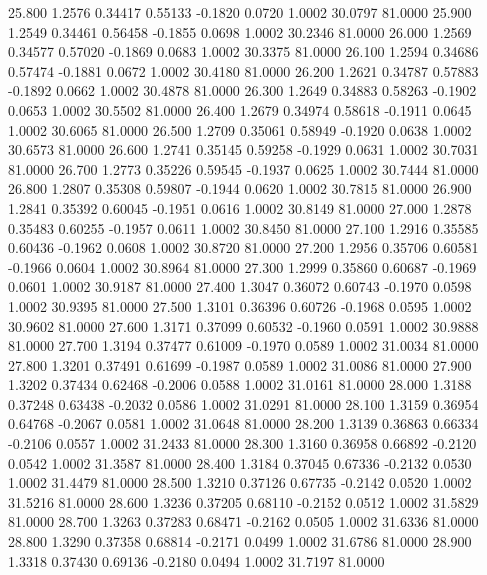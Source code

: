   25.800   1.2576   0.34417   0.55133  -0.1820   0.0720   1.0002  30.0797  81.0000
  25.900   1.2549   0.34461   0.56458  -0.1855   0.0698   1.0002  30.2346  81.0000
  26.000   1.2569   0.34577   0.57020  -0.1869   0.0683   1.0002  30.3375  81.0000
  26.100   1.2594   0.34686   0.57474  -0.1881   0.0672   1.0002  30.4180  81.0000
  26.200   1.2621   0.34787   0.57883  -0.1892   0.0662   1.0002  30.4878  81.0000
  26.300   1.2649   0.34883   0.58263  -0.1902   0.0653   1.0002  30.5502  81.0000
  26.400   1.2679   0.34974   0.58618  -0.1911   0.0645   1.0002  30.6065  81.0000
  26.500   1.2709   0.35061   0.58949  -0.1920   0.0638   1.0002  30.6573  81.0000
  26.600   1.2741   0.35145   0.59258  -0.1929   0.0631   1.0002  30.7031  81.0000
  26.700   1.2773   0.35226   0.59545  -0.1937   0.0625   1.0002  30.7444  81.0000
  26.800   1.2807   0.35308   0.59807  -0.1944   0.0620   1.0002  30.7815  81.0000
  26.900   1.2841   0.35392   0.60045  -0.1951   0.0616   1.0002  30.8149  81.0000
  27.000   1.2878   0.35483   0.60255  -0.1957   0.0611   1.0002  30.8450  81.0000
  27.100   1.2916   0.35585   0.60436  -0.1962   0.0608   1.0002  30.8720  81.0000
  27.200   1.2956   0.35706   0.60581  -0.1966   0.0604   1.0002  30.8964  81.0000
  27.300   1.2999   0.35860   0.60687  -0.1969   0.0601   1.0002  30.9187  81.0000
  27.400   1.3047   0.36072   0.60743  -0.1970   0.0598   1.0002  30.9395  81.0000
  27.500   1.3101   0.36396   0.60726  -0.1968   0.0595   1.0002  30.9602  81.0000
  27.600   1.3171   0.37099   0.60532  -0.1960   0.0591   1.0002  30.9888  81.0000
  27.700   1.3194   0.37477   0.61009  -0.1970   0.0589   1.0002  31.0034  81.0000
  27.800   1.3201   0.37491   0.61699  -0.1987   0.0589   1.0002  31.0086  81.0000
  27.900   1.3202   0.37434   0.62468  -0.2006   0.0588   1.0002  31.0161  81.0000
  28.000   1.3188   0.37248   0.63438  -0.2032   0.0586   1.0002  31.0291  81.0000
  28.100   1.3159   0.36954   0.64768  -0.2067   0.0581   1.0002  31.0648  81.0000
  28.200   1.3139   0.36863   0.66334  -0.2106   0.0557   1.0002  31.2433  81.0000
  28.300   1.3160   0.36958   0.66892  -0.2120   0.0542   1.0002  31.3587  81.0000
  28.400   1.3184   0.37045   0.67336  -0.2132   0.0530   1.0002  31.4479  81.0000
  28.500   1.3210   0.37126   0.67735  -0.2142   0.0520   1.0002  31.5216  81.0000
  28.600   1.3236   0.37205   0.68110  -0.2152   0.0512   1.0002  31.5829  81.0000
  28.700   1.3263   0.37283   0.68471  -0.2162   0.0505   1.0002  31.6336  81.0000
  28.800   1.3290   0.37358   0.68814  -0.2171   0.0499   1.0002  31.6786  81.0000
  28.900   1.3318   0.37430   0.69136  -0.2180   0.0494   1.0002  31.7197  81.0000
